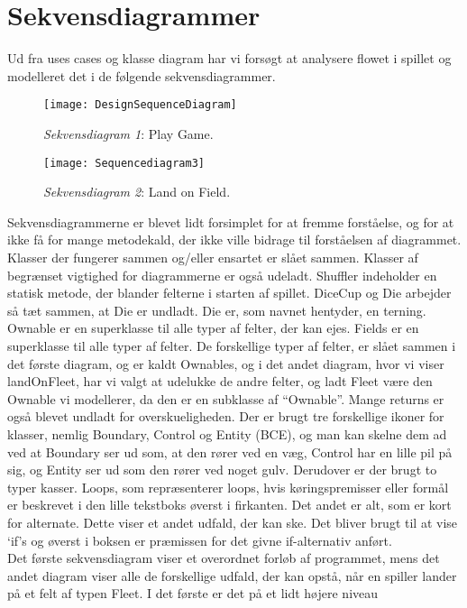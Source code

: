 \section*{Sekvensdiagrammer}
Ud fra uses cases og klasse diagram har vi forsøgt at analysere flowet i spillet
og modelleret det i de følgende sekvensdiagrammer.
\begin{figure}[h]
\centering
\noindent \texttt{[image: DesignSequenceDiagram]}
\caption{\emph{Sekvensdiagram 1}: Play Game.}
\end{figure}
\FloatBarrier
\begin{figure}[h]
\centering
\noindent \texttt{[image: Sequencediagram3]}
\caption{\emph{Sekvensdiagram 2}: Land on Field.}
\end{figure}
\FloatBarrier
Sekvensdiagrammerne er blevet lidt forsimplet for at fremme forståelse, og for
at ikke få for mange metodekald, der ikke ville bidrage til forståelsen af
diagrammet. Klasser der fungerer sammen og/eller ensartet er slået sammen.
Klasser af begrænset vigtighed for diagrammerne er også udeladt. Shuffler
indeholder en statisk metode, der blander felterne i starten af spillet. DiceCup
og Die arbejder så tæt sammen, at Die er undladt. Die er, som navnet hentyder,
en terning. Ownable er en superklasse til alle typer af felter, der kan ejes.
Fields er en superklasse til alle typer af felter. De forskellige typer af
felter, er slået sammen i det første diagram, og er kaldt Ownables, og i det
andet diagram, hvor vi viser landOnFleet, har vi valgt at udelukke de andre
felter, og ladt Fleet være den Ownable vi modellerer, da den er en subklasse af
“Ownable”. Mange returns er også blevet undladt for overskueligheden. Der er
brugt tre forskellige ikoner for klasser, nemlig Boundary, Control og Entity
(BCE), og man kan skelne dem ad ved at Boundary ser ud som, at den rører ved en
væg, Control har en lille pil på sig, og Entity ser ud som den rører ved noget
gulv. Derudover er der brugt to typer kasser. Loops, som repræsenterer loops,
hvis køringspremisser eller formål er beskrevet i den lille tekstboks øverst i
firkanten. Det andet er alt, som er kort for alternate. Dette viser et andet
udfald, der kan ske. Det bliver brugt til at vise ‘if’s og øverst i boksen er
præmissen for det givne if-alternativ anført.\\
\indent Det første sekvensdiagram viser et overordnet forløb af programmet, mens
det andet diagram viser alle de forskellige udfald, der kan opstå, når en spiller
lander på et  felt af typen Fleet. I det første er det på et lidt højere niveau
